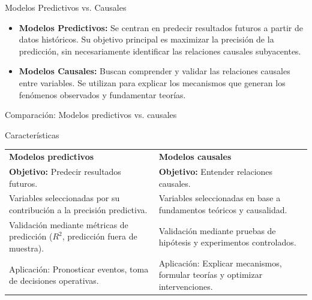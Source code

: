 ﻿\documentclass{beamer}
\begin{document}
\begin{frame}{Modelos Predictivos vs. Causales}
    \begin{itemize}
        \item \textbf{Modelos Predictivos:} Se centran en predecir resultados futuros a partir de datos históricos. Su objetivo principal es maximizar la precisión de la predicción, sin necesariamente identificar las relaciones causales subyacentes.
        \item \textbf{Modelos Causales:} Buscan comprender y validar las relaciones causales entre variables. Se utilizan para explicar los mecanismos que generan los fenómenos observados y fundamentar teorías.
    \end{itemize}
\end{frame}

\begin{frame}{Comparación: Modelos predictivos vs. causales}
    \begin{block}{Características}
    \begin{tabular}{p{5.5cm} p{5.5cm}}
      \textbf{Modelos predictivos} & \textbf{Modelos causales} \\[4mm]
      \textbf{Objetivo:} Predecir resultados futuros. & \textbf{Objetivo:} Entender relaciones causales. \\[2mm]
      Variables seleccionadas por su contribución a la precisión predictiva. & Variables seleccionadas en base a fundamentos teóricos y causalidad. \\[2mm]
      Validación mediante métricas de predicción (\(R^2\), predicción fuera de muestra). & Validación mediante pruebas de hipótesis y experimentos controlados. \\[2mm]
      Aplicación: Pronosticar eventos, toma de decisiones operativas. & Aplicación: Explicar mecanismos, formular teorías y optimizar intervenciones. \\
    \end{tabular}
    \end{block}
\end{frame}
\end{document}
